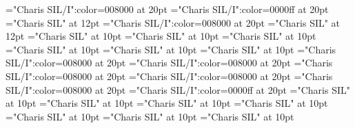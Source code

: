 \documentclass[a4paper]{article}
\begin{document}
\pagestyle{plain}
\sloppy
\setlength{\parfillskip}{0pt plus 1fil}
\font\pronunciationenUSpronunciationarticlebefore="Charis SIL/I":color=008000 at 20pt
\font\pronunciationenUKpronunciationenUSbefore="Charis SIL/I":color=0000ff at 20pt
\font\pronunciationenUSfirstoftypebefore="Charis SIL" at 12pt
\font\pronunciationenUSpronunciationbefore="Charis SIL/I":color=008000 at 20pt
\font\pronunciationenUSbefore="Charis SIL" at 12pt
\font\sectionletterdictionary="Charis SIL" at 10pt
\font\headsectionletterdictionary="Charis SIL" at 10pt
\font\articledictionary="Charis SIL" at 10pt
\font\firstoftypeheadwordlastoftypearticledictionary="Charis SIL" at 10pt
\font\firstoftypegrammarrequireslastoftypearticledictionary="Charis SIL" at 10pt
\font\firstoftypelastoftyperelationsynonymarticledictionary="Charis SIL" at 10pt
\font\firstoftypepronunciationenUKarticledictionary="Charis SIL/I":color=008000 at 20pt
\font\pronunciationfirstoftypebeforearticledictionary="Charis SIL/I":color=008000 at 20pt
\font\firstoftypepronunciationenUSarticledictionary="Charis SIL/I":color=008000 at 20pt
\font\pronunciationenUSfirstoftypebeforearticledictionary="Charis SIL/I":color=008000 at 20pt
\font\lastoftypepronunciationenUKarticledictionary="Charis SIL/I":color=008000 at 20pt
\font\pronunciationenUKpronunciationenUSbeforearticledictionary="Charis SIL/I":color=0000ff at 20pt
\font\firstoftypegrammarcategorylastoftypearticledictionary="Charis SIL" at 10pt
\font{}="Charis SIL" at 10pt
\font\firstoftypelastoftypenotearticledictionary="Charis SIL" at 10pt
\font\exampleusefirstoftypearticledictionary="Charis SIL" at 10pt
\font\examplefirstoftypearticledictionary="Charis SIL" at 10pt
\font\exampleuselastoftypearticledictionary="Charis SIL" at 10pt
\font\examplelastoftypearticledictionary="Charis SIL" at 10pt

\pagestyle{fancy} 


\end{document}
